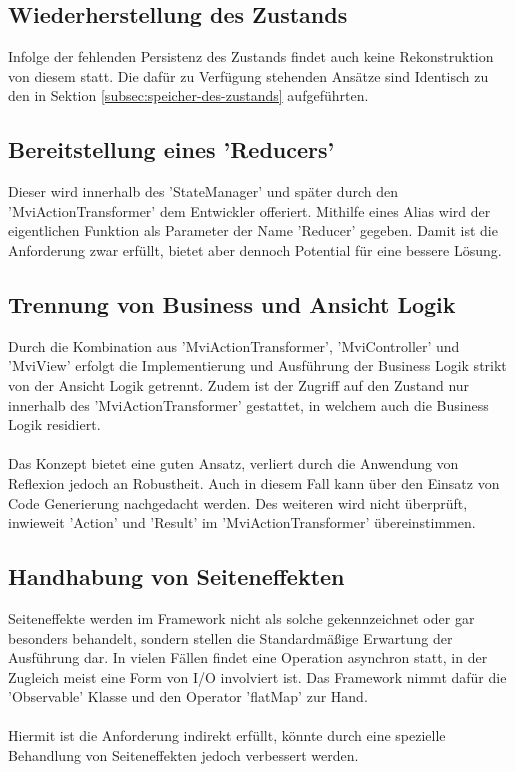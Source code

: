 \subsection{Wiederherstellung des Zustands}
Infolge der fehlenden Persistenz des Zustands findet auch keine Rekonstruktion von diesem statt. Die dafür zu Verfügung stehenden Ansätze sind Identisch zu den in Sektion
\ref{subsec:speicher-des-zustands}
aufgeführten.

\subsection{Bereitstellung eines 'Reducers'}
Dieser wird innerhalb des 'StateManager' und später durch den 'MviActionTransformer' dem Entwickler offeriert. Mithilfe eines Alias wird der eigentlichen Funktion als Parameter der Name 'Reducer' gegeben.
Damit ist die Anforderung zwar erfüllt, bietet aber dennoch Potential für eine bessere Lösung.


\subsection{Trennung von Business und Ansicht Logik}
Durch die Kombination aus 'MviActionTransformer', 'MviController' und 'MviView' erfolgt die Implementierung und Ausführung der Business Logik strikt von der Ansicht Logik getrennt. Zudem ist der Zugriff auf den Zustand nur innerhalb des 'MviActionTransformer' gestattet, in welchem auch die Business Logik residiert. 
\\\\
Das Konzept bietet eine guten Ansatz, verliert durch die Anwendung von Reflexion jedoch an Robustheit. Auch in diesem Fall kann über den Einsatz von Code Generierung nachgedacht werden. Des weiteren wird nicht überprüft, inwieweit 'Action' und 'Result' im 'MviActionTransformer' übereinstimmen.

\subsection{Handhabung von Seiteneffekten}
Seiteneffekte werden im Framework nicht als solche gekennzeichnet oder gar besonders behandelt, sondern stellen die Standardmäßige Erwartung der Ausführung dar. In vielen Fällen findet eine Operation asynchron statt, in der Zugleich meist eine Form von I/O involviert ist. Das Framework nimmt dafür die 'Observable' Klasse und den Operator 'flatMap' zur Hand.
\\\\
Hiermit ist die Anforderung indirekt erfüllt, könnte durch eine spezielle Behandlung von Seiteneffekten jedoch verbessert werden.

